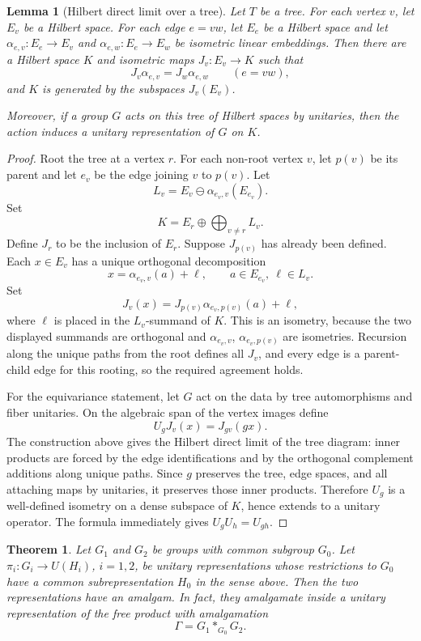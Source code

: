 \documentclass[11pt]{article}
\newtheorem{theorem}{Theorem}
\newtheorem{lemma}{Lemma}
\begin{document}
\begin{lemma}[Hilbert direct limit over a tree]
\label{lem:tree-limit}
Let \(T\) be a tree.  For each vertex \(v\), let \(E_v\) be a Hilbert space.
For each edge \(e=vw\), let \(E_e\) be a Hilbert space and let
\(\alpha_{e,v}\colon E_e\to E_v\) and
\(\alpha_{e,w}\colon E_e\to E_w\) be isometric linear embeddings.  Then there
are a Hilbert space \(K\) and isometric maps \(J_v\colon E_v\to K\) such that
\[
J_v\alpha_{e,v}=J_w\alpha_{e,w}\qquad(e=vw),
\]
and \(K\) is generated by the subspaces \(J_v(E_v)\).

Moreover, if a group \(G\) acts on this tree of Hilbert spaces by unitaries,
then the action induces a unitary representation of \(G\) on \(K\).
\end{lemma}

\begin{proof}
Root the tree at a vertex \(r\).  For each non-root vertex \(v\), let \(p(v)\)
be its parent and let \(e_v\) be the edge joining \(v\) to \(p(v)\).  Let
\[
L_v=E_v\ominus \alpha_{e_v,v}(E_{e_v}).
\]
Set
\[
K=E_r\oplus \bigoplus_{v\ne r} L_v.
\]
Define \(J_r\) to be the inclusion of \(E_r\).  Suppose \(J_{p(v)}\) has
already been defined.  Each \(x\in E_v\) has a unique orthogonal decomposition
\[
x=\alpha_{e_v,v}(a)+\ell,\qquad a\in E_{e_v},\ \ell\in L_v.
\]
Set
\[
J_v(x)=J_{p(v)}\alpha_{e_v,p(v)}(a)+\ell,
\]
where \(\ell\) is placed in the \(L_v\)-summand of \(K\).  This is an isometry,
because the two displayed summands are orthogonal and
\(\alpha_{e_v,v}\), \(\alpha_{e_v,p(v)}\) are isometries.  Recursion along
the unique paths from the root defines all \(J_v\), and every edge is a
parent-child edge for this rooting, so the required agreement holds.

For the equivariance statement, let \(G\) act on the data by tree automorphisms
and fiber unitaries.  On the algebraic span of the vertex images define
\[
U_g J_v(x)=J_{gv}(g x).
\]
The construction above gives the Hilbert direct limit of the tree diagram:
inner products are forced by the edge identifications and by the orthogonal
complement additions along unique paths.  Since \(g\) preserves the tree,
edge spaces, and all attaching maps by unitaries, it preserves those inner
products.  Therefore \(U_g\) is a well-defined isometry on a dense subspace of
\(K\), hence extends to a unitary operator.  The formula immediately gives
\(U_gU_h=U_{gh}\).
\end{proof}

\begin{theorem}
\label{thm:unitary-amalgam}
Let \(G_1\) and \(G_2\) be groups with common subgroup \(G_0\).  Let
\(\pi_i\colon G_i\to U(H_i)\), \(i=1,2\), be unitary representations whose
restrictions to \(G_0\) have a common subrepresentation \(H_0\) in the sense
above.  Then the two representations have an amalgam.  In fact, they
amalgamate inside a unitary representation of the free product with
amalgamation
\[
\Gamma=G_1*_{G_0}G_2.
\]
\end{theorem}
\end{document}
